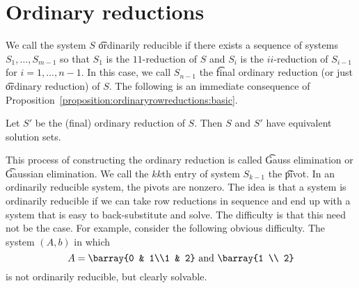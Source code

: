 \section*{Ordinary reductions}

We call the system $S$ \t{ordinarily reducible} if there exists a sequence of systems $S_1, \dots , S_{m-1}$ so that $S_1$ is the $11$-reduction of $S$ and $S_{i}$ is the $ii$-reduction of $S_{i-1}$ for $i = 1, \dots , n-1$.
In this case, we call $S_{n-1}$ the \t{final ordinary reduction} (or just \t{ordinary reduction}) of $S$.
The following is an immediate consequence of Proposition~\ref{proposition:ordinaryrowreductions:basic}.
\begin{proposition}

  \label{proposition:ordinary_row_reductions:main}Let $S'$ be the (final) ordinary reduction of $S$. Then $S$ and $S'$ have equivalent solution sets.
\end{proposition}


This process of constructing the ordinary reduction is called \t{Gauss elimination} or \t{Gaussian elimination}.
We call the $kk$th entry of system $S_{k-1}$ the \t{pivot}.
In an ordinarily reducible system, the pivots are nonzero.
The idea is that a system is ordinarily reducible if we can take row reductions in sequence and end up with a system that is easy to back-substitute and solve.
The difficulty is that this need not be the case.
For example, consider the following obvious difficulty.
The system $(A, b)$ in which
\[
A = \barray{0 & 1\\1 & 2} \text{ and } \barray{1 \\ 2}
\]
is not ordinarily reducible, but clearly solvable.
